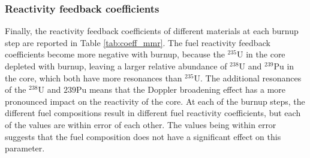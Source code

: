 \subsubsection{Reactivity feedback coefficients}
Finally, the reactivity feedback coefficients of different materials 
at each burnup step are reported in Table \ref{tab:coeff_mmr}. The 
fuel reactivity feedback coefficients become more negative with 
burnup, because the $^{235}$U in the core depleted with burnup, 
leaving a larger relative abundance of $^{238}$U and $^{239}$Pu in 
the core, which both have more resonances than $^{235}$U. The 
additional resonances of the $^{238}$U and ${239}$Pu means that the 
Doppler broadening effect has a more pronounced impact on the reactivity 
of the core. At each of the burnup steps, the different fuel compositions 
result in different fuel reactivity coefficients, but each of the values 
are within error of each other. The values being within error suggests 
that the fuel composition does not have a significant effect on 
this parameter. 

